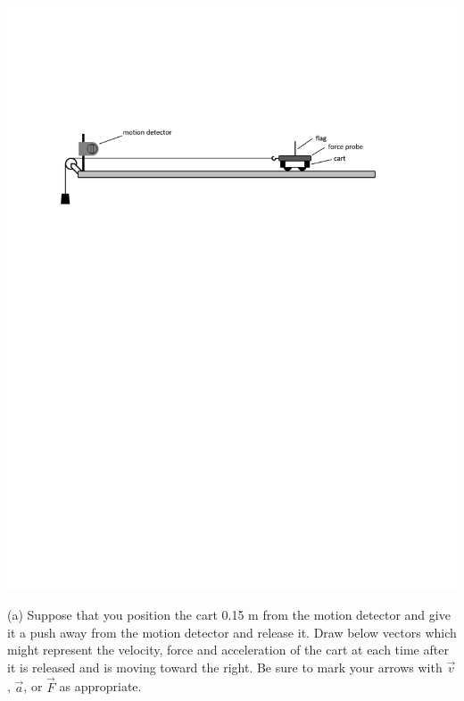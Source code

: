 \vspace{0.3cm}
{\par\centering \includegraphics{force2/cart_and_detectors.pdf} \par}
\vspace{0.3cm}

(a) Suppose that you position the cart 0.15 m from the motion detector and give
it a push away from the motion detector and release it. Draw below vectors which
might represent the velocity, force and acceleration of the cart at each time
after it is released and is moving toward the right. Be sure to mark your arrows
with \( {\vec v} \), \( {\vec a} \), or \( {\vec F} \)
as appropriate.

